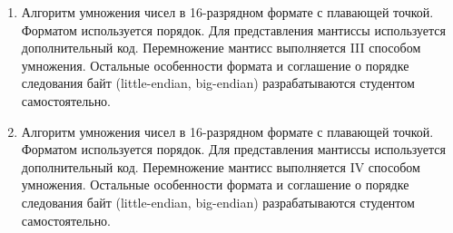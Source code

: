 \begin{enumerate}
    \item Алгоритм умножения чисел в 16-разрядном формате с плавающей точкой. Форматом используется порядок. Для представления мантиссы используется дополнительный код. Перемножение мантисс выполняется III способом умножения. Остальные особенности формата и соглашение о порядке следования байт (little-endian, big-endian) разрабатываются студентом самостоятельно.
    \item Алгоритм умножения чисел в 16-разрядном формате с плавающей точкой. Форматом используется порядок. Для представления мантиссы используется дополнительный код. Перемножение мантисс выполняется IV способом умножения. Остальные особенности формата и соглашение о порядке следования байт (little-endian, big-endian) разрабатываются студентом самостоятельно.
\end{enumerate}
